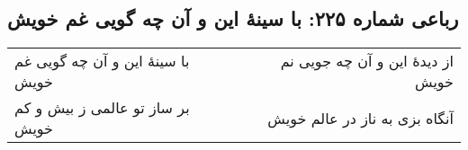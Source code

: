 \begin{center}
\section*{رباعی شماره ۲۲۵: با سینهٔ این و آن چه گویی غم خویش}
\label{sec:sh225}
\begin{longtable}{l p{0.5cm} r}
با سینهٔ این و آن چه گویی غم خویش
&&
از دیدهٔ این و آن چه جویی نم خویش
\\
بر ساز تو عالمی ز بیش و کم خویش
&&
آنگاه بزی به ناز در عالم خویش
\\
\end{longtable}
\end{center}
